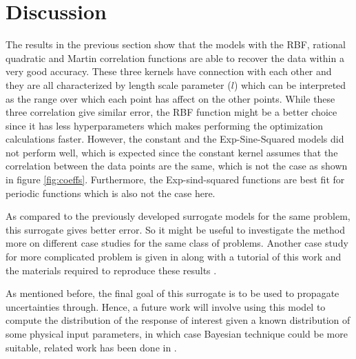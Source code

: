 \documentclass{anstrans}
\begin{document}
\section{Discussion}
The results in the previous section show that the models with the RBF, rational quadratic and Martin correlation functions are able to recover the data within a very good accuracy. 
These three kernels have connection with each other and they are all characterized by length scale parameter ($l$) which can be interpreted as the range over which each point has affect on the other points.
While these three correlation give similar error, the RBF function might be a better choice since it has less hyperparameters which makes performing the optimization calculations faster.
However, the constant and the Exp-Sine-Squared models did not perform well, which is expected since the constant kernel assumes that the correlation between the data points are the same, which is not the case as shown in figure \ref{fig:coeffs}. 
Furthermore, the Exp-sind-squared functions are best fit for periodic functions which is also not the case here.

As compared to the previously developed surrogate models for the same problem, this surrogate gives better error. So it might be useful to investigate the method more on different case studies for the same class of problems. 
Another case study for more complicated problem is given in  along with a tutorial of this work and the materials required to reproduce these results \cite{RababGit}.

As mentioned before, the final goal of this surrogate is to be used to propagate uncertainties through. Hence, a future work will involve using this model to compute the distribution of the response of interest given a known distribution of some physical input parameters, in which case Bayesian technique could be more suitable, related work has been done in \cite{assessing} .

 


\end{document}
